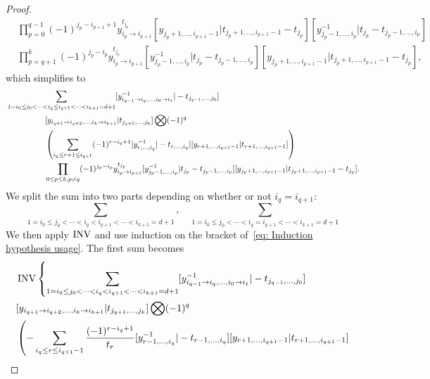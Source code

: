 \begin{proof}
\begin{equation}
\begin{aligned}
&\prod_{p=0}^{q-1}(-1)^{j_p-i_{p+1}+1}y_{i_p\to i_{p+1}}^{t_{j_p}}[y_{j_p+1,\dots,i_{p+1}-1}|t_{j_p+1,\dots,i_{p+1}-1}-t_{j_p}][y_{j_p-1,\dots,i_p}^{-1}|t_{j_p}-t_{j_p-1,\dots,i_p}]\\
&\prod_{p=q+1}^k(-1)^{j_p-i_p}y_{i_p\to i_{p+1}}^{t_{j_p}}[y_{j_p-1,\dots,i_p}^{-1}|t_{j_p}-t_{j_p-1,\dots,i_p}][y_{j_p+1,\dots,i_{p+1}-1}|t_{j_p+1,\dots,i_{p+1}-1}-t_{j_p}],
\end{aligned}
\end{equation}
which simplifies to
\begin{equation}\label{eq: Induction hypothesis usage}
\begin{aligned}
&\sum_{1=i_0\leq j_0<\cdots<i_q\leq i_{q+1}<\cdots<i_{k+1}=d+1}[y_{i_{q-1}\to i_q,\dots,i_0\to i_1}^{-1}|-t_{j_{q-1},\dots,j_0}]\\
&\hspace*{4pc}[y_{i_{q+1}\to i_{q+2},\dots,i_k\to i_{k+1}}|t_{j_{q+1},\dots,j_k}]\bigotimes(-1)^q\\
&\hspace*{4pc}\left(\sum_{i_q\leq r+1\leq i_{q+1}}(-1)^{r-i_q+1}[y_{r,\dots,i_q}^{-1}|-t_{r,\dots,i_q}][y_{r+1,\dots,i_{q+1}-1}|t_{r+1,\dots,i_{q+1}-1}]\right)\\
&\hspace*{4pc}\prod_{0\leq p\leq k,p\neq q}(-1)^{j_p-i_p}y_{i_p\to i_{p+1}}^{t_{j_p}}[y_{j_p-1,\dots,i_p}^{-1}|t_{j_p}-t_{j_p-1,\dots,i_p}][y_{j_p+1,\dots,i_{p+1}-1}|t_{j_p+1,\dots,i_{p+1}-1}-t_{j_p}].
\end{aligned}
\end{equation}
We split the sum into two parts depending on whether or not $i_q=i_{q+1}$:
\begin{equation}
\sum_{1=i_0\leq j_0<\cdots<i_q<i_{q+1}<\cdots<i_{k+1}=d+1},\quad\sum_{1=i_0\leq j_0<\cdots<i_q=i_{q+1}<\cdots<i_{k+1}=d+1}
\end{equation}
We then apply $\operatorname{INV}$ and use induction on the bracket of~\eqref{eq: Induction hypothesis usage}. The first sum becomes
\begin{equation}
\begin{aligned}
&\INV\left\{\sum_{1=i_0\leq j_0<\cdots<i_q< i_{q+1}<\cdots<i_{k+1}=d+1}[y_{i_{q-1}\to i_q,\dots,i_0\to i_1}^{-1}|-t_{j_{q-1},\dots,j_0}]\right.\\
&[y_{i_{q+1}\to i_{q+2},\dots,i_k\to i_{k+1}}|t_{j_{q+1},\dots,j_k}]\bigotimes(-1)^q\\
&\left(-\sum_{i_q\leq r\leq i_{q+1}-1}\frac{(-1)^{r-i_q+1}}{t_r}[y_{r-1,\dots,i_q}^{-1}|-t_{r-1,\dots,i_q}][y_{r+1,\dots,i_{q+1}-1}|t_{r+1,\dots,i_{q+1}-1}]\right.\\

\end{aligned}
\end{equation}
\end{proof}

